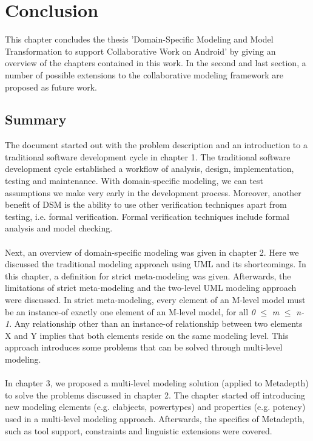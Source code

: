 \chapter{Conclusion}

This chapter concludes the thesis 'Domain-Specific Modeling and Model Transformation to support Collaborative Work on Android' by giving an overview of the chapters contained in this work. In the second and last section, a number of possible extensions to the collaborative modeling framework are proposed as future work. 

\section{Summary}

The document started out with the problem description and an introduction to a traditional software development cycle in chapter 1. The traditional software development cycle established a workflow of analysis, design, implementation, testing and maintenance. With domain-specific modeling, we can  test assumptions we make very early in the development process. Moreover, another benefit of DSM is the ability to use other verification techniques apart from testing, i.e. formal verification. Formal verification techniques include formal analysis and model checking. \\ \\
Next, an overview of domain-specific modeling was given in chapter 2. Here we discussed the traditional modeling approach using UML and its shortcomings. In this chapter, a definition for strict meta-modeling was given. Afterwards, the limitations of strict meta-modeling and the two-level UML modeling approach were discussed. In strict meta-modeling, every element of an M-level model must be an instance-of exactly one element of an M-level model, for all \textit{0} $\leq$ \textit{m} $\le$ \textit{n-1}. Any relationship other than an instance-of relationship between two elements X and Y implies that both elements reside on the same modeling level. This approach introduces some problems that can be solved through multi-level modeling. \\ \\
In chapter 3, we proposed a multi-level modeling solution (applied to Metadepth) to solve the problems discussed in chapter 2. The chapter started off introducing new modeling elements (e.g. clabjects, powertypes) and properties (e.g. potency) used in a multi-level modeling approach. Afterwards, the specifics of Metadepth, such as tool support, constraints and linguistic extensions were covered. \\ \\

